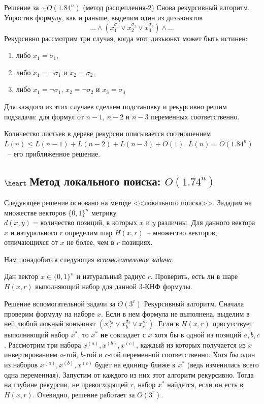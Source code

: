 \begin{algodescription}{Решение за $\sim O(1.84^n)$ (метод расщепления-2)}
	Снова рекурсивный алгоритм. Упростив формулу, как и раньше, выделим один из дизъюнктов $$\ldots\land(x_1^{\sigma_1} \lor x_2^{\sigma_2} \lor x_3^{\sigma_3})\land\ldots$$ Рекурсивно рассмотрим три случая, когда этот дизъюнкт может быть истинен:
    \begin{enumerate}
    \item либо $x_1 = \sigma_1$,
    \item либо $x_1 = \neg\sigma_1$ и $x_2 = \sigma_2$,
    \item либо $x_1 = \neg\sigma_1$, $x_2 = \neg\sigma_2$ и $x_3 = \sigma_3$
    \end{enumerate}
    Для каждого из этих случаев сделаем подстановку и рекурсивно решим подзадачи: для формул от $n-1$, $n-2$ и $n-3$ переменных соответственно.

    Количество листьев в дереве рекурсии описывается соотношением $L(n) \le L(n-1) + L(n-2) + L(n-3) + O(1)$. $L(n) = O(1.84^n)$~-- его приближенное решение.
\end{algodescription}

\subsection{$\heart~$Метод локального поиска: $O(1.74^n)$} \hypertarget{3satlocal}{}
Следующее решение основано на методе <<локального поиска>>. Зададим на множестве векторов $\{0, 1\}^n$ метрику $d(x, y) = \text{количество позиций, в которых } x \text{ и } y \text{ различны}$. Для данного вектора $x$ и натурального $r$ определим шар $H(x, r)$~-- множество векторов, отличающихся от $x$ не более, чем в $r$ позициях.

Нам понадобится следующая \hypertarget{flip20}{\textit{вспомогательная задача}}.

\begin{problem*}
    Дан вектор $x \in \{0, 1\}^n$ и натуральный радиус $r$. Проверить, есть ли в шаре $H(x, r)$ выполняющий набор для данной 3-КНФ формулы.
\end{problem*}

\begin{algodescription}{Решение вспомогательной задачи за $O(3^r)$}
    Рекурсивный алгоритм. Сначала проверим формулу на наборе $x$. Если в нем формула не выполнена, выделим в ней любой ложный конъюнкт $(x_a^{\sigma_a} \lor x_b^{\sigma_b} \lor x_c^{\sigma_c})$. Если в $H(x, r)$ присутствует выполняющий набор $x^*$, то $x^*$ \textbf{не} совпадает с $x$ хотя бы в одной из позиций $a,b,c$. Рассмотрим три набора $x^{(a)}, x^{(b)}, x^{(c)}$, каждый из которых получается из $x$ инвертированием $a$-той, $b$-той и $c$-той переменной соответственно. Хотя бы один из наборов  $x^{(a)}, x^{(b)}, x^{(c)}$ будет на единицу ближе к $x^*$ (ведь изменилась всего одна переменная). Запустим от каждого из них этот алгоритм рекурсивно. Тогда на глубине рекурсии, не превосходящей $r$, набор $x^*$ найдется, если он есть в $H(x, r)$. Очевидно, решение работает за $O(3^r)$.
\end{algodescription}

